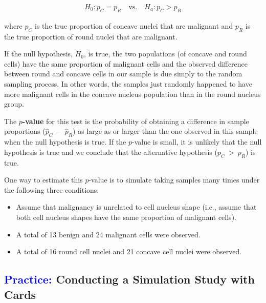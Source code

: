 \documentclass[
]{report}
\begin{document}
\begin{align}\label{5.1}
H_0: p_C = p_R \quad\text{vs.}\quad H_a: p_C > p_R 
\tag{5.1}
\end{align}

where \(\scriptstyle p_C\) is the true proportion of concave nuclei that are malignant and \(\scriptstyle p_R\) is the true proportion of round nuclei that are malignant.

If the null hypothesis, \(\scriptstyle H_0\), is true, the two populations (of concave and round cells) have the same proportion of malignant cells and the observed difference between round and concave cells in our sample is due simply to the random sampling process. In other words, the samples just randomly happened to have more malignant cells in the concave nucleus population than in the round nucleus group.

The \textbf{\(\scriptstyle p\)-value} for this test is the probability of obtaining a difference in sample proportions (\(\scriptstyle \hat p_C \ -\  \hat p_R\)) as large as or larger than the one observed in this sample when the null hypothesis is true. If the \(\scriptstyle p\)-value is small, it is unlikely that the null hypothesis is true and we conclude that the alternative hypothesis (\(\scriptstyle p_C \ >\  p_R\)) is true.

One way to estimate this \(\scriptstyle p\)-value is to simulate taking samples many times under the following three conditions:
\vspace{-1em}

\begin{itemize}
\item Assume that malignancy is unrelated to cell nucleus shape (i.e., assume that both cell nucleus shapes have the same proportion of malignant cells).  
\item A total of 13 benign and 24 malignant cells were observed.  
\item A total of 16 round cell nuclei and 21 concave cell nuclei were observed.
\end{itemize}

\hypertarget{conducting-a-simulation-study-with-cards}{%
\subsection*{\texorpdfstring{\textcolor{blue}{Practice:} Conducting a Simulation Study with Cards}{ Conducting a Simulation Study with Cards}}\label{conducting-a-simulation-study-with-cards}}
\end{document}
